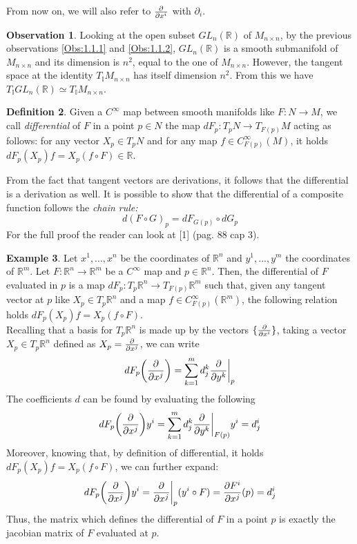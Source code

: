 \documentclass[12pt,a4paper]{report}
\theoremstyle{definition}
\newtheorem{Def}{Definition}[chapter]
\theoremstyle{Theorem}
\theoremstyle{definition}
\newtheorem{Ex}[Def]{Example}
\theoremstyle{definition}
\newtheorem{Obs}[Def]{Observation}
\begin{document}
	From now on, we will also refer to $\partial\over \partial x^i$ with $\partial_i$.
	\begin{Obs} \label{Obs 1.1.3}
		Looking at the open subset $GL_n(\mathbb{R})$ of $M_{n\times n}$, by the previous observations \ref{Obs:1.1.1} and \ref{Obs:1.1.2}, $GL_n(\mathbb{R})$ is a smooth submanifold of $M_{n\times n}$ and its dimension is $n^2$, equal to the one of $M_{n\times n}$. However, the tangent space at the identity $T_\mathbb{I}M_{n\times n}$ has itself dimension $n^2$. From this we have $T_\mathbb{I}GL_n(\mathbb{R})\simeq T_\mathbb{I}M_{n\times n}$.
	\end{Obs}
	\begin{Def}
		Given a $C^\infty$ map between smooth manifolds like $F:N\rightarrow M$, we call \textit{differential} of $F$ in a point $p\in N$ the map $dF_p:T_pN\rightarrow T_{F(p)}M$ acting as follows: for any vector $X_p\in T_pN$ and for any map $f\in C_{F(p)}^\infty(M)$, it holds $dF_p(X_p)f=X_p(f\circ F)\in\mathbb{R}$.
	\end{Def}
	From the fact that tangent vectors are derivations, it follows that the differential is a derivation as well. It is possible to show that the differential of a composite function follows the \textit{chain rule:} 
	$$d(F\circ G)_p=dF_{G(p)}\circ dG_p$$ 
	For the full proof the reader can look at [1] (pag. 88 cap 3).
	\begin{Ex}
		Let $x^1,...,x^n$ be the coordinates of $\mathbb{R}^n$ and $y^1,...,y^m$ the coordinates of $\mathbb{R}^m$. Let $F:\mathbb{R}^n\rightarrow \mathbb{R}^m$ be a $C^\infty$ map and $p\in \mathbb{R}^n$. Then, the differential of $F$ evaluated in $p$ is a map $dF_p:T_p\mathbb{R}^n\rightarrow T_{F(p)}\mathbb{R}^m$ such that, given any tangent vector at $p$ like $X_p\in T_p\mathbb{R}^n$ and a map $f\in C_{F(p)}^\infty(\mathbb{R}^m)$, the following relation holds $dF_p(X_p)f=X_p(f\circ F)$.\\
		Recalling that a basis for $T_p\mathbb{R}^n$ is made up by the vectors $\{{\partial\over\partial x^i}\}$, taking a vector $X_p\in T_p\mathbb{R}^n$ defined as $X_p={\partial\over \partial x^j}$, we can write $$dF_p\bigg{(}{\partial\over \partial x^j}\bigg{)}=\sum_{k=1}^{m}d_j^k{\partial\over \partial y^k}\bigg{\rvert}_p$$
		The coefficients $d$ can be found by evaluating the following 
		$$dF_p\bigg{(}{\partial\over \partial x^j}\bigg{)}y^i=\sum_{k=1}^{m}d_j^k{\partial\over \partial y^k}\bigg{\rvert}_{F(p)}y^i=d_j^i$$
		Moreover, knowing that, by definition of differential, it holds $dF_p(X_p)f=X_p(f\circ F)$, we can further expand:
		$$dF_p\bigg{(}{\partial\over \partial x^j}\bigg{)}y^i={\partial\over \partial x^j}\bigg{\rvert}_p(y^i\circ F)={\partial F^i\over \partial x^j}(p)=d^i_j$$
		Thus, the matrix which defines the differential of $F$ in a point $p$ is exactly the jacobian matrix of $F$ evaluated at $p$.
	\end{Ex}
\end{document}
